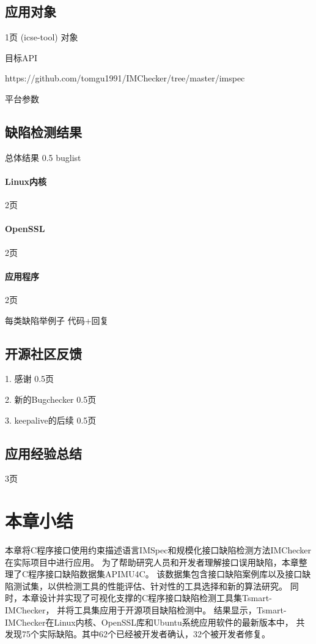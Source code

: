 \subsection{应用对象}
1页
(icse-tool)
对象

目标API

https://github.com/tomgu1991/IMChecker/tree/master/imspec

平台参数



\subsection{缺陷检测结果}

总体结果
0.5
buglist

\paragraph{Linux内核}
2页

\paragraph{OpenSSL}
2页

\paragraph{应用程序}
2页

每类缺陷举例子
代码+回复


\subsection{开源社区反馈}
1. 感谢
0.5页

2. 新的Bugchecker
0.5页

3. keepalive的后续
0.5页

\subsection{应用经验总结}

3页

\section{本章小结}
\label{sec:4.5}
本章将C程序接口使用约束描述语言IMSpec和规模化接口缺陷检测方法IMChecker在实际项目中进行应用。
为了帮助研究人员和开发者理解接口误用缺陷，本章整理了C程序接口缺陷数据集APIMU4C。
该数据集包含接口缺陷案例库以及接口缺陷测试集，以供检测工具的性能评估、针对性的工具选择和新的算法研究。
同时，本章设计并实现了可视化支撑的C程序接口缺陷检测工具集Tsmart-IMChecker，
并将工具集应用于开源项目缺陷检测中。
结果显示，Tsmart-IMChecker在Linux内核、OpenSSL库和Ubuntu系统应用软件的最新版本中，
共发现75个实际缺陷。其中62个已经被开发者确认，32个被开发者修复。
